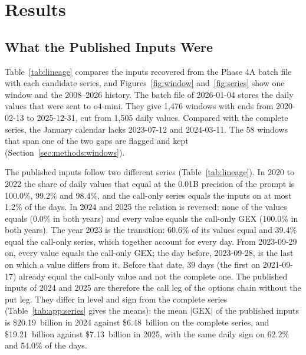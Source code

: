 \section{Results}
\label{sec:results}

\subsection{What the Published Inputs Were}
\label{sec:results:inputs}

Table~\ref{tab:lineage} compares the inputs recovered from the Phase 4A batch file with each candidate series, and Figures~\ref{fig:window} and~\ref{fig:series} show one window and the 2008--2026 history.
The batch file of 2026-01-04 stores the daily values that were sent to o4-mini. They give 1{,}476 windows with ends from 2020-02-13 to 2025-12-31, cut from 1{,}505 daily values. Compared with the complete series, the January calendar lacks 2023-07-12 and 2024-03-11. The 58 windows that span one of the two gaps are flagged and kept (Section~\ref{sec:methods:windows}).

The published inputs follow two different series (Table~\ref{tab:lineage}). In 2020 to 2022 the share of daily values that equal  at the 0.01B precision of the prompt is 100.0\%, 99.2\% and 98.4\%, and the call-only series equals the inputs on at most 1.2\% of the days. In 2024 and 2025 the relation is reversed: none of the values equals  (0.0\% in both years) and every value equals the call-only GEX (100.0\% in both years). The year 2023 is the transition: 60.6\% of its values equal  and 39.4\% equal the call-only series, which together account for every day. From 2023-09-29 on, every value equals the call-only GEX; the day before, 2023-09-28, is the last on which a value differs from it. Before that date, 39 days (the first on 2021-09-17) already equal the call-only value and not the complete one. The published inputs of 2024 and 2025 are therefore the call leg of the options chain without the put leg. They differ in level and sign from the complete series (Table~\ref{tab:app:series} gives the means): the mean $|\mathrm{GEX}|$ of the published inputs is \$20.19~billion in 2024 against \$6.48~billion on the complete series, and \$19.21~billion against \$7.13~billion in 2025, with the same daily sign on 62.2\% and 54.0\% of the days.

